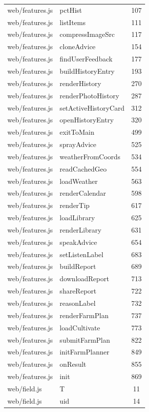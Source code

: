\begin{center}
\begin{longtable}{@{}p{4.6cm}p{5.2cm}c@{}}
web/features.js & pctHist & 107 \\
web/features.js & listItems & 111 \\
web/features.js & compressImageSrc & 117 \\
web/features.js & cloneAdvice & 154 \\
web/features.js & findUserFeedback & 177 \\
web/features.js & buildHistoryEntry & 193 \\
web/features.js & renderHistory & 270 \\
web/features.js & renderPhotoHistory & 287 \\
web/features.js & setActiveHistoryCard & 312 \\
web/features.js & openHistoryEntry & 320 \\
web/features.js & exitToMain & 499 \\
web/features.js & sprayAdvice & 525 \\
web/features.js & weatherFromCoords & 534 \\
web/features.js & readCachedGeo & 554 \\
web/features.js & loadWeather & 563 \\
web/features.js & renderCalendar & 598 \\
web/features.js & renderTip & 617 \\
web/features.js & loadLibrary & 625 \\
web/features.js & renderLibrary & 631 \\
web/features.js & speakAdvice & 654 \\
web/features.js & setListenLabel & 683 \\
web/features.js & buildReport & 689 \\
web/features.js & downloadReport & 713 \\
web/features.js & shareReport & 722 \\
web/features.js & reasonLabel & 732 \\
web/features.js & renderFarmPlan & 737 \\
web/features.js & loadCultivate & 773 \\
web/features.js & submitFarmPlan & 822 \\
web/features.js & initFarmPlanner & 849 \\
web/features.js & onResult & 855 \\
web/features.js & init & 869 \\
web/field.js & T & 11 \\
web/field.js & uid & 14 \\

\end{longtable}
\end{center}
